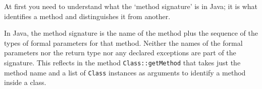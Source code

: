 \documentclass[11pt,a4paper, titlepage, parskip=half, headsepline, footsepline, cleardoublepage=current, headheight=1cm]{scrbook}
\begin{document}
At first you need to understand what the ‘method signature’ is in Java; it is what identifies a method and distinguishes it from another.

In Java, the method signature is the name of the method plus the sequence of the types of formal parameters for that method. Neither the names of the formal parameters nor the return type nor any declared exceptions are part of the signature. This reflects in the method \lstinline|Class::getMethod|\autocite{ORACLE_DOC_CLASS:getMethod,ORACLE_DOC_CLASS:getDeclaredMethod} that takes just the method name and a list of \lstinline|Class| instances as arguments to identify a method inside a class.

\end{document}
